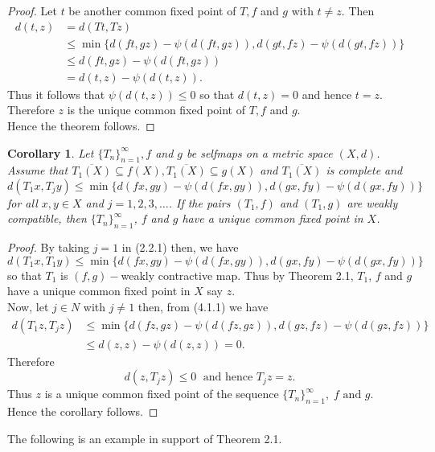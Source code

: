 \documentclass[11]{article}
\newtheorem{corollary}[definition]{Corollary}
\numberwithin{equation}{definition}
\begin{document}
\begin{proof}
Let $t$ be another common fixed point of $T,f$ and $g$ with $t\neq z$.
Then
\begin{align*}
d(t,z) &= d(Tt,Tz) \\
&\leq \min\{d(ft,gz)-\psi(d(ft,gz)),d(gt,fz)-\psi(d(gt,fz))\} \\
&\leq d(ft,gz)-\psi(d(ft,gz)) \\
&= d(t,z)-\psi(d(t,z)).
\end{align*}
Thus it follows that $\psi(d(t,z))\leq 0$ so that $d(t,z)=0$ and hence $t=z$.\\
Therefore $z$ is the unique common fixed point of $T,f$ and $g$.\\
Hence the theorem follows.
\end{proof}

\begin{corollary}
Let $\{T_{n}\}_{n=1}^{\infty},f$ and $g$ be selfmaps on a metric space $(X,d)$.
Assume that $\overline{T_{1}(X)}\subseteq f(X),\overline{T_{1}(X)}\subseteq g(X)$ and $\overline{T_{1}(X)}$ is complete and
\begin{equation}
d(T_{1}x,T_{j}y)\leq\min\{d(fx,gy)-\psi(d(fx,gy)),d(gx,fy)-\psi(d(gx,fy))\}
\end{equation}
for all $x,y\in X$ and $j=1,2,3,\ldots$. If the pairs $(T_{1},f)$ and $(T_{1},g)$ are weakly compatible, then $\{T_{n}\}_{n=1}^{\infty}$, $f$ and $g$ have a unique common fixed point in $X$.
\end{corollary}

\begin{proof}
By taking $j=1$ in (2.2.1) then, we have
\[
d(T_{1}x,T_{1}y)\leq\min\{d(fx,gy)-\psi(d(fx,gy)),d(gx,fy)-\psi(d(gx,fy))\}
\]
so that $T_{1}$ is $(f,g)-$weakly contractive map.
Thus by Theorem 2.1, $T_{1}$, $f$ and $g$ have a unique common fixed point in $X$
say $z$.\\
Now, let $j\in N$ with $j\neq 1$ then, from (4.1.1) we have
\begin{align*}
d(T_{1}z,T_{j}z) &\leq \min\{d(fz,gz)-\psi(d(fz,gz)),d(gz,fz)-\psi(d(gz,fz))\} \\
&\leq d(z,z)-\psi(d(z,z)) = 0.
\end{align*}
Therefore
\[
d(z,T_{j}z)\leq 0\;\text{ and hence }T_{j}z=z.
\]
Thus $z$ is a unique common fixed point of the sequence $\{T_{n}\}_{n=1}^{\infty},\;f\text{ and }g.$\\
Hence the corollary follows.
\end{proof}
The following is an example in support of Theorem 2.1.
\end{document}

